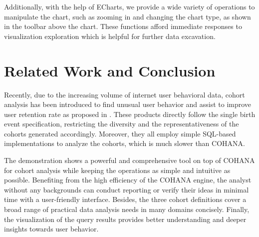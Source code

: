 Additionally, with the help of ECharts\cite{echarts}, we provide a wide variety of operations to manipulate the chart, such as zooming in and changing the chart type, as shown in the toolbar above the chart. These functions afford immediate responses to visualization exploration which is helpful for further data excavation.

\section{Related Work and Conclusion}

Recently, due to the increasing volume of internet user behavioral data, cohort
analysis has been introduced to find unusual user behavior and assist to
improve user retention rate as proposed in \cite{amplitude, mixpanel, rjmetrics}. These
products directly follow the single birth event specification, restricting the diversity and the representativeness of the cohorts generated accordingly.
Moreover, they all employ simple SQL-based implementations to analyze the cohorts, which is much slower than COHANA.

The demonstration shows a powerful and comprehensive tool on top of COHANA for cohort analysis while keeping the operations as simple and intuitive as possible. Benefiting from the high efficiency of the COHANA engine, the analyst without any backgrounds can conduct reporting or verify their ideas in minimal time with a user-friendly interface. Besides, the three cohort definitions cover a broad range of practical data analysis needs in many domains concisely. Finally, the visualization of the query results provides better understanding and deeper insights towards user behavior.